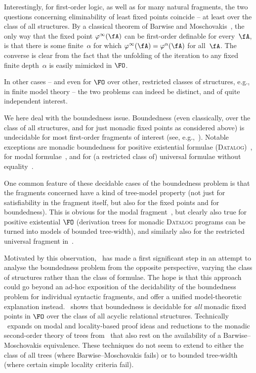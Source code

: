 \documentclass{LMCS}
\begin{document}
Interestingly, for first-order logic, as well as for many natural
fragments, the two questions concerning eliminability of least fixed
points coincide -- at least over the class of all structures.
By a classical theorem of
Barwise and Moschovakis~\cite{BarwiseMoschovakis78},
the only way that the fixed point $\varphi^\infty(\fA)$ can be
first-order definable for every~$\fA$, is that there is some finite~$\alpha$
for which $\varphi^\infty(\fA) = \varphi^\alpha(\fA)$
for all~$\fA$. The converse is clear from the fact that the unfolding
of the iteration to any fixed finite depth~$\alpha$ is easily mimicked
in $\FO$.

In other cases -- and even for $\FO$ over other, restricted classes of
structures, e.g., in finite model theory -- the two problems can
indeed be distinct, and of quite independent interest.

We here deal with the boundedness issue.
Boundedness (even classically, over the class of all structures, and
for just monadic fixed points as considered above) is
undecidable for most first-order fragments of interest (see, e.g.,~\cite{HillebrandEtAl95}).
Notable exceptions are monadic boundedness for positive existential
formulae (\textsc{Datalog})~\cite{CosmadakisGaKaVa88},
for modal formulae~\cite{Otto99}, and for
(a restricted class of) universal formulae without equality~\cite{Otto06}.

One common feature of these decidable cases of the boundedness problem
is that the fragments concerned have a kind of tree-model property
(not just for satisfiability in the fragment itself, but also for the
fixed points and for boundedness).
This is obvious for the modal fragment~\cite{Otto99}, but clearly
also true for positive existential $\FO$ (derivation trees for monadic
\textsc{Datalog} programs can be turned into models of bounded tree-width),
and similarly also for the restricted universal fragment in~\cite{Otto06}.

Motivated by this observation,
\cite{KOS}~has made a first significant step
in an attempt to analyse the boundedness problem from the opposite perspective,
varying the class of structures rather than the class of formulae. The hope
is that this approach could go beyond an ad-hoc exposition of the
decidability of the boundedness problem for individual syntactic fragments,
and offer a unified model-theoretic explanation instead.
\cite{KOS}~shows that boundedness is decidable for
\emph{all} monadic fixed points in $\FO$ over the class of all acyclic
relational structures.
Technically \cite{KOS}~expands on modal
and locality-based proof ideas and reductions to
the monadic second-order theory of trees from~\cite{Otto99,Otto06}
that also rest on the availability of a Barwise--Moschovakis
equivalence. These techniques do not seem to extend to either
the class of all trees (where Barwise--Moschovakis fails) or to
bounded tree-width (where certain simple locality criteria fail).
\end{document}
